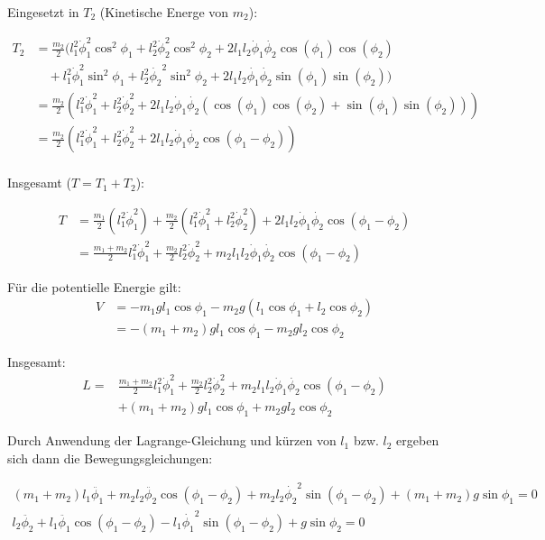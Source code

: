 \documentclass[a4paper,german,12pt,smallheadings]{scrartcl}
\begin{document}
Eingesetzt in $T_2$ (Kinetische Energe von $m_2$):

\begin{align*}
  T_2 &= \frac{m_2}{2} (l_1^2 \dot{\phi}_1^2 \cos^2 \phi_1 + l_2^2 \dot{\phi}_2^2 \cos^2 \phi_2 + 2l_1l_2\dot{\phi}_1\dot{\phi_2}\cos(\phi_1) \cos(\phi_2) \\
      &\quad + l_1^2 \dot{\phi}_1^2 \sin^2 \phi_1 + l_2^2 \dot{\phi_2}^2 \sin^2 \phi_2 + 2l_1l_2\dot{\phi_1}\dot{\phi_2}\sin(\phi_1)\sin(\phi_2)) \\
      &= \frac{m_2}{2} (l_1^2 \dot{\phi}_1^2 + l_2^2 \dot{\phi}_2^2 + 2l_1l_2\dot{\phi}_1\dot{\phi_2} (\cos(\phi_1) \cos(\phi_2) + \sin(\phi_1)\sin(\phi_2))) \\
      &= \frac{m_2}{2} (l_1^2 \dot{\phi}_1^2 + l_2^2 \dot{\phi}_2^2 + 2l_1l_2\dot{\phi}_1\dot{\phi_2} \cos(\phi_1 - \phi_2)) \\
\end{align*}

Insgesamt ($T = T_1 + T_2$):

\begin{align*}
  T &= \frac{m_1}{2} (l_1^2 \dot{\phi}_1^2) + \frac{m_2}{2} (l_1^2 \dot{\phi}_1^2 + l_2^2 \dot{\phi}_2^2) + 2l_1l_2\dot{\phi}_1\dot{\phi_2} \cos(\phi_1 - \phi_2) \\
    &= \frac{m_1 + m_2}{2} l_1^2 \dot{\phi}_1^2 + \frac{m_2}{2} l_2^2 \dot{\phi}_2^2 + m_2l_1l_2\dot{\phi}_1\dot{\phi_2} \cos(\phi_1 - \phi_2)
\end{align*}

Für die potentielle Energie gilt:
\begin{align*}
  V &= -m_1gl_1 \cos \phi_1 - m_2g(l_1 \cos \phi_1 + l_2 \cos \phi_2) \\
    &= -(m_1 + m_2)gl_1 \cos \phi_1 - m_2gl_2 \cos \phi_2
\end{align*}

Insgesamt:
\begin{align*}
  L = &\frac{m_1 + m_2}{2} l_1^2 \dot{\phi}_1^2 + \frac{m_2}{2} l_2^2 \dot{\phi}_2^2 + m_2l_1l_2\dot{\phi}_1\dot{\phi_2} \cos(\phi_1 - \phi_2) \\
      &+(m_1 + m_2)gl_1 \cos \phi_1 + m_2gl_2 \cos \phi_2
\end{align*}

Durch Anwendung der Lagrange-Gleichung und kürzen von $l_1$ bzw. $l_2$ ergeben
sich dann die Bewegungsgleichungen:

\begin{align*}
  (m_1 + m_2)l_1 \ddot{\phi_1} + m_2 l_2 \ddot{\phi_2} \cos(\phi_1 - \phi_2) + m_2 l_2 \dot{\phi_2}^2 \sin(\phi_1 - \phi_2) + (m_1 + m_2) g \sin \phi_1 = 0\\
  l_2 \ddot{\phi_2} + l_1 \ddot{\phi_1} \cos(\phi_1 - \phi_2) - l_1 \dot{\phi_1}^2 \sin(\phi_1 - \phi_2) + g \sin\phi_2 = 0
\end{align*}
\end{document}

